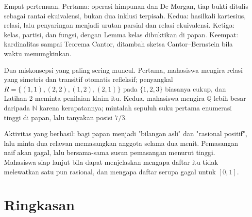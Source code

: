 \begin{untukdosen}
Empat pertemuan. Pertama: operasi himpunan dan De Morgan, tiap bukti ditulis sebagai
rantai ekuivalensi, bukan dua inklusi terpisah. Kedua: hasilkali kartesius, relasi, lalu
penyaringan menjadi urutan parsial dan relasi ekuivalensi. Ketiga: kelas, partisi, dan
fungsi, dengan Lemma kelas dibuktikan di papan. Keempat: kardinalitas sampai Teorema
Cantor, ditambah sketsa Cantor--Bernstein bila waktu memungkinkan.

Dua miskonsepsi yang paling sering muncul. Pertama, mahasiswa mengira relasi yang
simetris dan transitif otomatis refleksif; penyangkal $R = \{(1,1),(2,2),(1,2),(2,1)\}$
pada $\{1,2,3\}$ biasanya cukup, dan Latihan 2 meminta penilaian klaim itu. Kedua,
mahasiswa mengira $\mathbb{Q}$ lebih besar daripada $\mathbb{N}$ karena kerapatannya;
mintalah sepuluh suku pertama enumerasi tinggi di papan, lalu tanyakan posisi $7/3$.

Aktivitas yang berhasil: bagi papan menjadi "bilangan asli" dan "rasional positif", lalu
minta dua relawan memasangkan anggota selama dua menit. Pemasangan naif akan gagal,
lalu bersama-sama susun pemasangan menurut tinggi. Mahasiswa siap lanjut bila dapat
menjelaskan mengapa daftar itu tidak melewatkan satu pun rasional, dan mengapa daftar
serupa gagal untuk $[0,1]$.
\end{untukdosen}

\section{Ringkasan}

